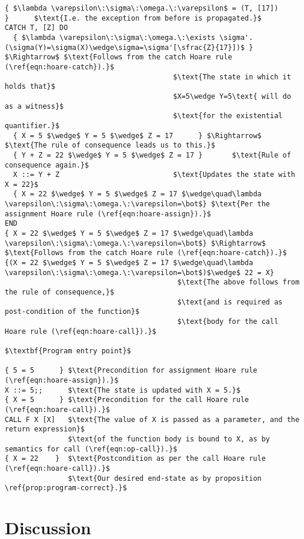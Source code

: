 \begin{lstlisting}[mathescape=true,keepspaces=true,label=lst:hoare_ex_asgn,caption=Decorated variant of the program from listing \ref{lst:imp-plus-ex}.]
  { $\lambda \varepsilon\:\sigma\:\omega.\:\varepsilon$ = (T, [17])          }      $\text{I.e. the exception from before is propagated.}$
CATCH T, [Z] DO
  { $\lambda \varepsilon\:\sigma\:\omega.\:\exists \sigma'.(\sigma(Y)=\sigma(X)\wedge\sigma=\sigma'[\sfrac{Z}{17}])$ } $\Rightarrow$ $\text{Follows from the catch Hoare rule (\ref{eqn:hoare-catch}).}$
                                        $\text{The state in which it holds that}$
                                        $X=5\wedge Y=5\text{ will do as a witness}$
                                        $\text{for the existential quantifier.}$
  { X = 5 $\wedge$ Y = 5 $\wedge$ Z = 17      } $\Rightarrow$    $\text{The rule of consequence leads us to this.}$
  { Y + Z = 22 $\wedge$ Y = 5 $\wedge$ Z = 17 }       $\text{Rule of consequence again.}$
  X ::= Y + Z                           $\text{Updates the state with X = 22}$
  { X = 22 $\wedge$ Y = 5 $\wedge$ Z = 17 $\wedge\quad\lambda \varepsilon\:\sigma\:\omega.\:\varepsilon=\bot$} $\text{Per the assignment Hoare rule (\ref{eqn:hoare-assign}).}$
END
{ X = 22 $\wedge$ Y = 5 $\wedge$ Z = 17 $\wedge\quad\lambda \varepsilon\:\sigma\:\omega.\:\varepsilon=\bot$} $\Rightarrow$ $\text{Follows from the catch Hoare rule (\ref{eqn:hoare-catch}).}$
{(X = 22 $\wedge$ Y = 5 $\wedge$ Z = 17 $\wedge\quad\lambda \varepsilon\:\sigma\:\omega.\:\varepsilon=\bot$)$\wedge$ 22 = X}
                                         $\text{The above follows from the rule of consequence,}$
                                         $\text{and is required as post-condition of the function}$
                                         $\text{body for the call Hoare rule (\ref{eqn:hoare-call}).}$

$\textbf{Program entry point}$

{ 5 = 5      } $\text{Precondition for assignment Hoare rule (\ref{eqn:hoare-assign}).}$
X ::= 5;;      $\text{The state is updated with X = 5.}$
{ X = 5      } $\text{Precondition for the call Hoare rule (\ref{eqn:hoare-call}).}$
CALL F X [X]   $\text{The value of X is passed as a parameter, and the return expression}$
               $\text{of the function body is bound to X, as by semantics for call (\ref{eqn:op-call}).}$
{ X = 22    }  $\text{Postcondition as per the call Hoare rule (\ref{eqn:hoare-call}).}$
               $\text{Our desired end-state as by proposition \ref{prop:program-correct}.}$
\end{lstlisting}

\section{Discussion}

